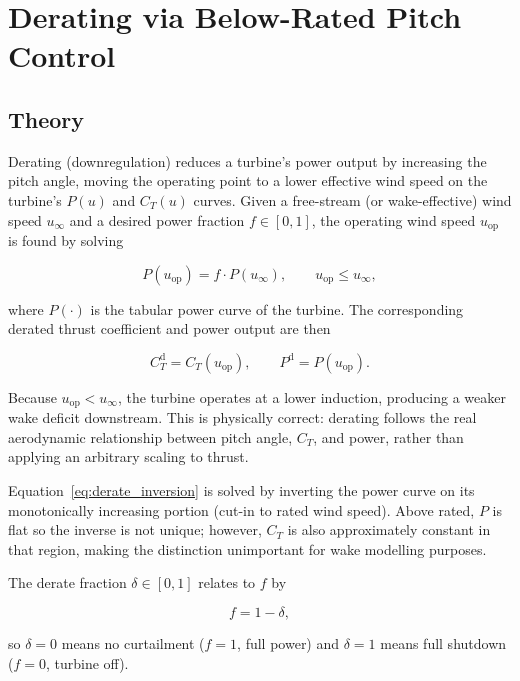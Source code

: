\section{Derating via Below-Rated Pitch Control}

\subsection{Theory}

Derating (downregulation) reduces a turbine's power output by increasing the pitch
angle, moving the operating point to a lower effective wind speed on the turbine's
$P(u)$ and $C_T(u)$ curves.
Given a free-stream (or wake-effective) wind speed $u_\infty$ and a desired power
fraction $f \in [0,1]$, the operating wind speed $u_\text{op}$ is found by solving

\begin{equation}
    P(u_\text{op}) = f \cdot P(u_\infty), \qquad u_\text{op} \leq u_\infty,
    \label{eq:derate_inversion}
\end{equation}

where $P(\cdot)$ is the tabular power curve of the turbine.
The corresponding derated thrust coefficient and power output are then

\begin{equation}
    C_T^\text{d} = C_T(u_\text{op}), \qquad P^\text{d} = P(u_\text{op}).
    \label{eq:derated_ct}
\end{equation}

Because $u_\text{op} < u_\infty$, the turbine operates at a lower induction, producing a
weaker wake deficit downstream.
This is physically correct: derating follows the real aerodynamic relationship between
pitch angle, $C_T$, and power, rather than applying an arbitrary scaling to thrust.

Equation~\eqref{eq:derate_inversion} is solved by inverting the power curve on its
monotonically increasing portion (cut-in to rated wind speed).
Above rated, $P$ is flat so the inverse is not unique; however, $C_T$ is also
approximately constant in that region, making the distinction unimportant for wake
modelling purposes.

The derate fraction $\delta \in [0,1]$ relates to $f$ by

\begin{equation}
    f = 1 - \delta,
\end{equation}

so $\delta = 0$ means no curtailment ($f=1$, full power) and $\delta = 1$ means
full shutdown ($f=0$, turbine off).

